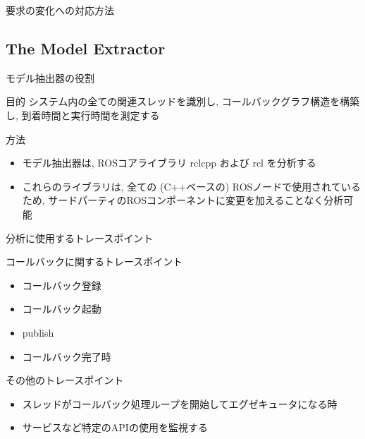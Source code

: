\begin{frame}{要求の変化への対応方法}
\end{frame}


\subsection{The Model Extractor}
\label{ssec: the model extractor}

\begin{frame}{モデル抽出器の役割}
    \begin{block}{目的}
        システム内の全ての関連スレッドを識別し, コールバックグラフ構造を構築し, 到着時間と実行時間を測定する
    \end{block}
    \begin{block}{方法}
        \setlength{\linewidth}{0.98\columnwidth}
        \begin{itemize}
            \item モデル抽出器は, ROSコアライブラリ $\mathrm{rclcpp}$ および $\mathrm{rcl}$ を分析する
            \item これらのライブラリは, 全ての (C++ベースの) ROSノードで使用されているため, サードパーティのROSコンポーネントに変更を加えることなく分析可能
        \end{itemize}
    \end{block}
\end{frame}

\begin{frame}{分析に使用するトレースポイント}
    \vspace{1mm}
    \begin{block}{コールバックに関するトレースポイント}
        \setlength{\linewidth}{0.98\columnwidth}
        \begin{itemize}
            \item コールバック登録
            \item コールバック起動
            \item publish
            \item コールバック完了時
        \end{itemize}
    \end{block}
    \begin{block}{その他のトレースポイント}
        \setlength{\linewidth}{0.98\columnwidth}
        \begin{itemize}
            \item スレッドがコールバック処理ループを開始してエグゼキュータになる時
            \item サービスなど特定のAPIの使用を監視する
        \end{itemize}
    \end{block}
\end{frame}

